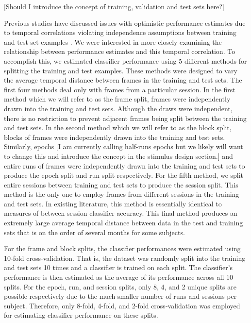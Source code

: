 \documentclass[final]{article}
\begin{document}
[Should I introduce the concept of training, validation and test sets here?]

Previous studies have discussed issues with optimistic performance estimates due to temporal correlations violating independence assumptions between training and test set examples \cite{Pereira2009}.
We were interested in more closely examining the relationship between performance estimates and this temporal correlation.
To accomplish this, we estimated classifier performance using 5 different methods for splitting the training and test examples.
These methods were designed to vary the average temporal distance between frames in the training and test sets.
The first four methods deal only with frames from a particular session.
In the first method which we will refer to as the frame split, frames were independently drawn into the training and test sets.
Although the draws were independent, there is no restriction to prevent adjacent frames being split between the training and test sets.
In the second method which we will refer to as the block split, blocks of frames were independently drawn into the training and test sets.
Similarly, epochs [I am currently calling half-runs epochs but we likely will want to change this and introduce the concept in the stimulus design section.] and entire runs of frames were independently drawn into the training and test sets to produce the epoch split and run split respectively.
For the fifth method, we split entire sessions between training and test sets to produce the session split.
This method is the only one to employ frames from different sessions in the training and test sets.
In existing literature, this method is essentially identical to measures of between session classifier accuracy.
This final method produces an extremely large average temporal distance between data in the test and training sets that is on the order of several months for some subjects.

For the frame and block splits, the classifier performances were estimated using 10-fold cross-validation.
That is, the dataset was randomly split into the training and test sets 10 times and a classifier is trained on each split.
The classifier's performance is then estimated as the average of its performance across all 10 splits.
For the epoch, run, and session splits, only 8, 4, and 2 unique splits are possible respectively due to the much smaller number of runs and sessions per subject.
Therefore, only 8-fold, 4-fold, and 2-fold cross-validation was employed for estimating classifier performance on these splits.
\end{document}
